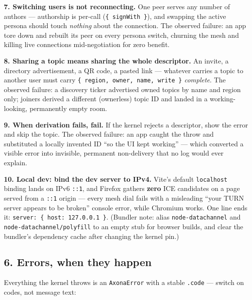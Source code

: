\documentclass[
  nobib]{tufte-handout}
\begin{document}
\textbf{7. Switching users is not reconnecting.} One peer serves any
number of authors --- authorship is per-call
(\texttt{\{\ signWith\ \}}), and swapping the active persona should
touch \emph{nothing} about the connection. The observed failure: an app
tore down and rebuilt its peer on every persona switch, churning the
mesh and killing live connections mid-negotiation for zero benefit.

\textbf{8. Sharing a topic means sharing the whole descriptor.} An
invite, a directory advertisement, a QR code, a pasted link --- whatever
carries a topic to another user must carry
\texttt{\{\ region,\ owner,\ name,\ write\ \}} \emph{complete}. The
observed failure: a discovery ticker advertised owned topics by name and
region only; joiners derived a different (ownerless) topic ID and landed
in a working-looking, permanently empty room.

\textbf{9. When derivation fails, fail.} If the kernel rejects a
descriptor, show the error and skip the topic. The observed failure: an
app caught the throw and substituted a locally invented ID ``so the UI
kept working'' --- which converted a visible error into invisible,
permanent non-delivery that no log would ever explain.

\textbf{10. Local dev: bind the dev server to IPv4.} Vite's default
\texttt{localhost} binding lands on IPv6 \texttt{::1}, and Firefox
gathers \textbf{zero} ICE candidates on a page served from a
\texttt{::1} origin --- every mesh dial fails with a misleading ``your
TURN server appears to be broken'' console error, while Chromium works.
One line ends it:
\texttt{server:\ \{\ host:\ \textquotesingle{}127.0.0.1\textquotesingle{}\ \}}.
(Bundler note: alias \texttt{node-datachannel} and
\texttt{node-datachannel/polyfill} to an empty stub for browser builds,
and clear the bundler's dependency cache after changing the kernel pin.)

\subsection{6. Errors, when they happen}\label{errors-when-they-happen}

Everything the kernel throws is an \texttt{AxonaError} with a stable
\texttt{.code} --- switch on codes, not message text:
\end{document}
